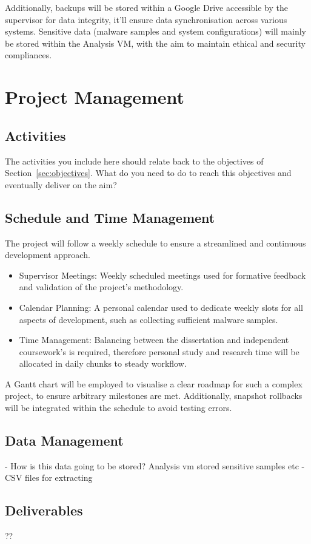 \documentclass[a4paper,12pt,oneside]{book}			%
\begin{document}
Additionally, backups will be stored within a Google Drive accessible by the supervisor for data integrity, it’ll ensure data synchronisation across various systems. Sensitive data (malware samples and system configurations) will mainly be stored within the Analysis VM, with the aim to maintain ethical and security compliances. 


\chapter{Project Management}\label{ch:project management}
\section{Activities}\label{sec:activities}

The activities you include here should relate back to the objectives of Section~\ref{sec:objectives}. What do you need to do to reach this objectives and eventually deliver on the aim?

\section{Schedule and Time Management}\label{sec:time management}

The project will follow a weekly schedule to ensure a streamlined and continuous development approach.
\begin{itemize}
	\item Supervisor Meetings: Weekly scheduled meetings used for formative feedback and validation of the project’s methodology.
	\item Calendar Planning: A personal calendar used to dedicate weekly slots for all aspects of development, such as collecting sufficient malware samples. 
	\item Time Management: Balancing between the dissertation and independent coursework’s is required, therefore personal study and research time will be allocated in daily chunks to steady workflow. 
\end{itemize}

A Gantt chart will be employed to visualise a clear roadmap for such a complex project, to ensure arbitrary milestones are met. Additionally, snapshot rollbacks will be integrated within the schedule to avoid testing errors.



\section{Data Management}\label{sec:data management}

- How is this data going to be stored? Analysis vm stored sensitive samples etc
- CSV files for extracting

\section{Deliverables}\label{sec: deliverables}

??


\printbibliography
\end{document}
